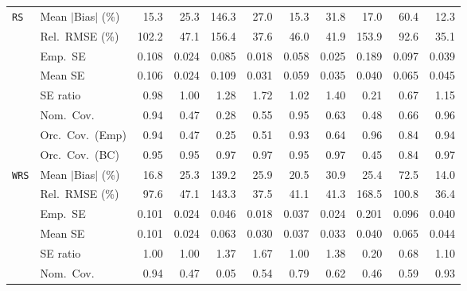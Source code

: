 \begin{landscape}
\begin{longtable}{llrrrrrrrrr}
\addlinespace[2pt]
\quad \texttt{RS} & Mean $|$Bias$|$ (\%) & \cellcolor{ranktwo}15.3 & 25.3 & 146.3 & 27.0 & \cellcolor{ranktwo}15.3 & 31.8 & \cellcolor{rankthree}17.0 & 60.4 & \cellcolor{rankone}12.3 \\
 & Rel.\ RMSE (\%) & 102.2 & 47.1 & 156.4 & \cellcolor{ranktwo}37.6 & 46.0 & \cellcolor{rankthree}41.9 & 153.9 & 92.6 & \cellcolor{rankone}35.1 \\
 & Emp.\ SE & 0.108 & 0.024 & 0.085 & 0.018 & 0.058 & 0.025 & 0.189 & 0.097 & 0.039 \\
 & Mean SE & 0.106 & 0.024 & 0.109 & 0.031 & 0.059 & 0.035 & 0.040 & 0.065 & 0.045 \\
 & SE ratio & \cellcolor{ranktwo}0.98 & \cellcolor{rankone}1.00 & 1.28 & 1.72 & \cellcolor{ranktwo}1.02 & 1.40 & 0.21 & 0.67 & \cellcolor{rankthree}1.15 \\
 & Nom.\ Cov. & \cellcolor{ranktwo}0.94 & 0.47 & 0.28 & 0.55 & \cellcolor{rankone}0.95 & 0.63 & 0.48 & \cellcolor{rankthree}0.66 & \cellcolor{ranktwo}0.96 \\
 & Orc.\ Cov.\ (Emp) & \cellcolor{rankone}0.94 & 0.47 & 0.25 & 0.51 & \cellcolor{ranktwo}0.93 & 0.64 & \cellcolor{rankone}0.96 & \cellcolor{rankthree}0.84 & \cellcolor{rankone}0.94 \\
 & Orc.\ Cov.\ (BC) & \cellcolor{rankone}0.95 & \cellcolor{ranktwo}0.95 & \cellcolor{rankthree}0.97 & \cellcolor{rankthree}0.97 & \cellcolor{rankone}0.95 & \cellcolor{rankthree}0.97 & 0.45 & 0.84 & \cellcolor{rankthree}0.97 \\
\addlinespace[2pt]
\quad \texttt{WRS} & Mean $|$Bias$|$ (\%) & \cellcolor{ranktwo}16.8 & 25.3 & 139.2 & 25.9 & \cellcolor{rankthree}20.5 & 30.9 & 25.4 & 72.5 & \cellcolor{rankone}14.0 \\
 & Rel.\ RMSE (\%) & 97.6 & 47.1 & 143.3 & \cellcolor{ranktwo}37.5 & \cellcolor{rankthree}41.1 & 41.3 & 168.5 & 100.8 & \cellcolor{rankone}36.4 \\
 & Emp.\ SE & 0.101 & 0.024 & 0.046 & 0.018 & 0.037 & 0.024 & 0.201 & 0.096 & 0.040 \\
 & Mean SE & 0.101 & 0.024 & 0.063 & 0.030 & 0.037 & 0.033 & 0.040 & 0.065 & 0.044 \\
 & SE ratio & \cellcolor{rankone}1.00 & \cellcolor{rankone}1.00 & 1.37 & 1.67 & \cellcolor{rankone}1.00 & 1.38 & 0.20 & \cellcolor{rankthree}0.68 & \cellcolor{ranktwo}1.10 \\
 & Nom.\ Cov. & \cellcolor{rankone}0.94 & 0.47 & 0.05 & 0.54 & \cellcolor{rankthree}0.79 & 0.62 & 0.46 & 0.59 & \cellcolor{ranktwo}0.93 \\

\end{longtable}
\end{landscape}
